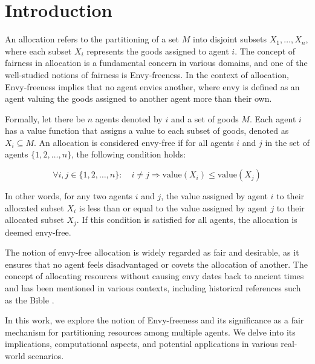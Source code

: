 \documentclass{article}
\begin{document}
\section{Introduction}

An allocation refers to the partitioning of a set $M$ into disjoint subsets $X_1, \ldots, X_n$, where each subset $X_i$ represents the goods assigned to agent $i$. The concept of fairness in allocation is a fundamental concern in various domains, and one of the well-studied notions of fairness is Envy-freeness. In the context of allocation, Envy-freeness implies that no agent envies another, where envy is defined as an agent valuing the goods assigned to another agent more than their own.

Formally, let there be $n$ agents denoted by $i$ and a set of goods $M$. Each agent $i$ has a value function that assigns a value to each subset of goods, denoted as $X_i \subseteq M$. An allocation is considered envy-free if for all agents $i$ and $j$ in the set of agents $\{1, 2, \ldots, n\}$, the following condition holds:

\[ \forall i, j \in \{1, 2, \ldots, n\}: \quad i \neq j \Rightarrow \text{value}(X_i) \leq \text{value}(X_j) \]

In other words, for any two agents $i$ and $j$, the value assigned by agent $i$ to their allocated subset $X_i$ is less than or equal to the value assigned by agent $j$ to their allocated subset $X_j$. If this condition is satisfied for all agents, the allocation is deemed envy-free.

The notion of envy-free allocation is widely regarded as fair and desirable, as it ensures that no agent feels disadvantaged or covets the allocation of another. The concept of allocating resources without causing envy dates back to ancient times and has been mentioned in various contexts, including historical references such as the Bible \cite{DBLP:journals/corr/PlautR17}.

In this work, we explore the notion of Envy-freeness and its significance as a fair mechanism for partitioning resources among multiple agents. We delve into its implications, computational aspects, and potential applications in various real-world scenarios.
\end{document}
